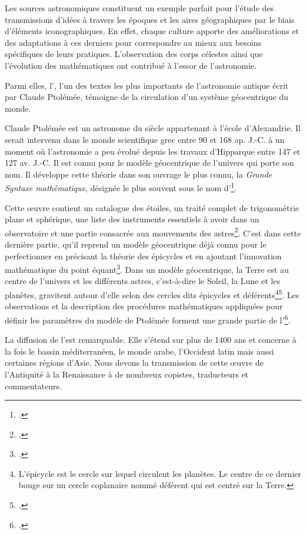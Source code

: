 Les sources astronomiques constituent un exemple parfait pour l'étude des transmissions d'idées à travers les époques et les aires géographiques par le biais d'éléments iconographiques. En effet, chaque culture apporte des améliorations et des adaptations à ces derniers pour correspondre au mieux aux besoins spécifiques de leurs pratiques. L'observation des corps célestes ainsi que l'évolution des mathématiques ont contribué à l'essor de l'astronomie. 

Parmi elles, l'\almageste, l'un des textes les plus importants de l'astronomie antique écrit par Claude Ptolémée, témoigne de la circulation d'un système géocentrique du monde.

Claude Ptolémée est un astronome du \II siècle appartenant à l'école d'Alexandrie. Il serait intervenu dans le monde scientifique grec entre 90 et 168 ap. J.-C. à un moment où l'astronomie a peu évolué depuis les travaux d'Hipparque entre 147 et 127 av. J.-C. Il est connu pour le modèle géocentrique de l'univers qui porte son nom. Il développe cette théorie dans son ouvrage le plus connu, la \textit{Grande Syntaxe mathématique}, désignée le plus souvent sous le nom d'\almageste\footcite{verdetLaubeLastronomieLaurore1990}. 

Cette œuvre contient un catalogue des étoiles, un traité complet de trigonométrie plane et sphérique, une liste des instruments essentiels à avoir dans un observatoire et une partie consacrée aux mouvements des astres\footcite{costabelClaudePtolemee90}.
C'est dans cette dernière partie, qu'il reprend un modèle géocentrique déjà connu pour le perfectionner en précisant la théorie des épicycles et en ajoutant l'innovation mathématique du point équant\footcite{friedlanderAstronomyAncientGreece2025}. 
Dans un modèle géocentrique, la Terre est au centre de l'univers et les différents astres, c'est-à-dire le Soleil, la Lune et les planètes, gravitent autour d'elle selon des cercles dits épicycles et déférents\footnote{L'épicycle est le cercle sur lequel circulent les planètes. Le centre de ce dernier bouge sur un cercle coplanaire nommé déférent qui est centré sur la Terre\cite{EpicyclesPtolemee}.}\footcite{costabelClaudePtolemee90}.
Les observations et la description des procédures mathématiques appliquées pour définir les paramètres du modèle de Ptolémée forment une grande partie de l'\almageste\footcite{friedlanderAstronomyAncientGreece2025}. 

La diffusion de l'\almageste est remarquable. Elle s'étend sur plus de 1400 ans et concerne à la fois le bassin méditerranéen, le monde arabe, l'Occident latin mais aussi certaines régions d'Asie. 
Nous devons la transmission de cette œuvre de l'Antiquité à la Renaissance à de nombreux copistes, traducteurs et commentateurs. 

